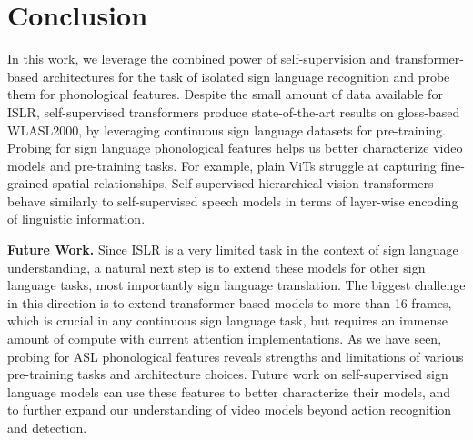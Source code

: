 \section{Conclusion}
\label{sec:conclusion}

In this work, we leverage the combined power of self-supervision and transformer-based architectures for the task of isolated sign language recognition and probe them for phonological features. Despite the small amount of data available for ISLR, self-supervised transformers produce state-of-the-art results on gloss-based WLASL2000, by leveraging continuous sign language datasets for pre-training. Probing for sign language phonological features helps us better characterize video models and pre-training tasks. For example, plain ViTs struggle at capturing fine-grained spatial relationships. Self-supervised hierarchical vision transformers behave similarly to self-supervised speech models in terms of layer-wise encoding of linguistic information.

\textbf{Future Work.} Since ISLR is a very limited task in the context of sign language understanding, a natural next step is to extend these models for other sign language tasks, most importantly sign language translation. The biggest challenge in this direction is to extend transformer-based models to more than 16 frames, which is crucial in any continuous sign language task, but requires an immense amount of compute with current attention implementations. As we have seen, probing for ASL phonological features reveals strengths and limitations of various pre-training tasks and architecture choices. Future work on self-supervised sign language models can use these features to better characterize their models, and to further expand our understanding of video models beyond action recognition and detection.
